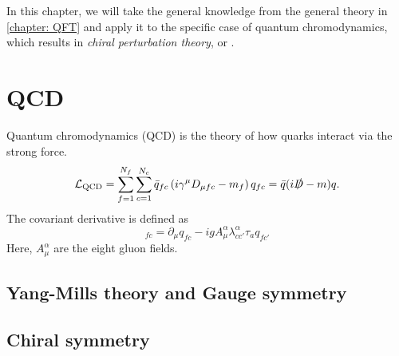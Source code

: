 In this chapter, we will take the general knowledge from the general theory in \autoref{chapter: QFT} and apply it to the specific case of quantum chromodynamics, which results in \emph{chiral perturbation theory}, or \chpt.

\section{QCD}

Quantum chromodynamics (QCD) is the theory of how quarks interact via the strong force.
%
\begin{equation}
    \mathcal{L}_{\text{QCD}} 
    = \sum_{f=1}^{N_f} \sum_{c=1}^{N_c} 
    \bar q_{fc} \left(i \gamma^\mu D_{\mu fc} - m_f\right) q_{fc}
    = \bar q (i \slashed D - m)q.
\end{equation}
%
The covariant derivative is defined as
%
\begin{equation}
    [D_\mu q]_{fc} 
    = 
    \partial_\mu q_{fc} 
    - i g A^\alpha_{\mu} \lambda^\alpha_{cc'} \tau_{a} q_{fc'} 
\end{equation}
%
Here, $A^\alpha_\mu$ are the eight gluon fields.

\subsection{Yang-Mills theory and Gauge symmetry}


\subsection{Chiral symmetry}

